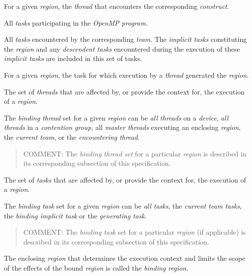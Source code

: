 \glossarydefstart
For a given \emph{region}, the \emph{thread} that encounters the 
corresponding \emph{construct}.
\glossarydefend

\glossarydefstart
All \emph{tasks} participating in the \emph{OpenMP program}. 
\glossarydefend

\glossarydefstart
All \emph{tasks} encountered by the corresponding \emph{team}. The \emph{implicit tasks}
constituting the  \emph{region} and any \emph{descendent tasks} encountered during 
the execution of these \emph{implicit tasks} are included in this set of tasks. 
\glossarydefend

\glossarydefstart
For a given \emph{region}, the task for which execution by a \emph{thread} generated the \emph{region}.
\glossarydefend

\glossarydefstart
The set of \emph{threads} that are affected by, or provide the context for, the execution of 
a \emph{region}. 

The \emph{binding thread} set for a given \emph{region} can be \emph{all threads} on a \emph{device}, \emph{all 
threads} in a \emph{contention group}, all \emph{master threads} executing an
enclosing  \emph{region}, the \emph{current team}, or the \emph{encountering thread}.

\begin{quote}
COMMENT: The \emph{binding thread set} for a particular \emph{region} is described in its 
corresponding subsection of this specification.
\end{quote}
\glossarydefend

\glossarydefstart
The set of \emph{tasks} that are affected by, or provide the context for, the execution of a 
\emph{region}. 

The \emph{binding task} set for a given \emph{region} can be \emph{all tasks}, 
the \emph{current team tasks}, the \emph{binding implicit task} or the \emph{generating task}. 

\begin{quote}
COMMENT: The \emph{binding task} set for a particular \emph{region} (if applicable) is 
described in its corresponding subsection of this specification.
\end{quote}
\glossarydefend

\pagebreak
{}
\glossarydefstart
The enclosing \emph{region} that determines the execution context and limits the scope of 
the effects of the bound \emph{region} is called the \emph{binding region}.

